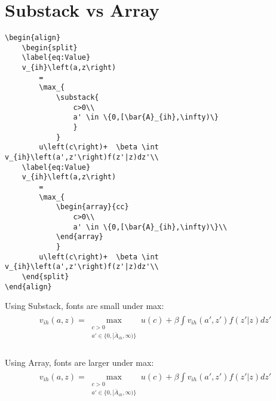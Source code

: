 \documentclass[12pt,english]{article}
\begin{document}
\pagebreak

\section{Substack vs Array}
\begin{verbatim}
\begin{align}
    \begin{split}
    \label{eq:Value}
    v_{ih}\left(a,z\right)
        =
        \max_{
            \substack{
                c>0\\
                a' \in \{0,[\bar{A}_{ih},\infty)\}
                }
            }
        u\left(c\right)+  \beta \int v_{ih}\left(a',z'\right)f(z'|z)dz'\\
    \label{eq:Value}
    v_{ih}\left(a,z\right)
        =
        \max_{
            \begin{array}{cc}
                c>0\\
                a' \in \{0,[\bar{A}_{ih},\infty)\}\\
            \end{array}
            }
        u\left(c\right)+  \beta \int v_{ih}\left(a',z'\right)f(z'|z)dz'\\
    \end{split}
\end{align}
\end{verbatim}

Using Substack, fonts are small under max:
\begin{align}
    \begin{split}
        \label{eq:Value}
        v_{ih}\left(a,z\right)
        =
        \max_{
            \substack{
                c>0\\
                a' \in \{0,[\bar{A}_{ih},\infty)\}
                }
            }
        u\left(c\right)+  \beta \int v_{ih}\left(a',z'\right)f(z'|z)dz'\\
    \end{split}
\end{align}

Using Array, fonts are larger under max:
\begin{align}
    \begin{split}
        \label{eq:Value}
        v_{ih}\left(a,z\right)
        =
        \max_{
            \begin{array}{cc}
                c>0\\
                a' \in \{0,[\bar{A}_{ih},\infty)\}\\
            \end{array}
            }
        u\left(c\right)+  \beta \int v_{ih}\left(a',z'\right)f(z'|z)dz'\\
    \end{split}
\end{align}
\end{document}
